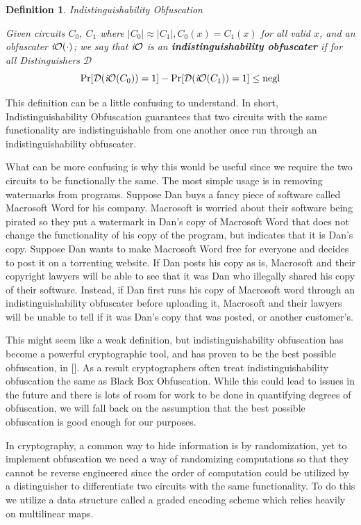 \documentclass[12pt,twoside]{reedthesis}
\newtheorem{definition}{Definition}
\begin{document}
    \begin{definition}{Indistinguishability Obfuscation}
    \par Given circuits $C_0,\ C_1$ where $|C_0| \approx |C_1|, C_0(x) = C_1(x)$ for all valid $x$, and an obfuscater $\textit{i}\mathcal{O}(\cdot)$; we say that $\textit{i}\mathcal{O}$ is an \textbf{indistinguishability obfuscater} if for all Distinguishers $\mathcal{D}$
    $$\Pr[\mathcal{D}(\textit{i}\mathcal{O}(C_0)) = 1] -\Pr[\mathcal{D}(\textit{i}\mathcal{O}(C_1)) = 1] \leq \text{negl}$$
    \end{definition}
    
    \par This definition can be a little confusing to understand. In short, Indistinguishability Obfuscation guarantees that two circuits with the same functionality are indistinguishable from one another once run through an indistinguishability obfuscater. 
    \par What can be more confusing is why this would be useful since we require the two circuits to be functionally the same. The most simple usage is in removing watermarks from programs. Suppose Dan buys a fancy piece of software called Macrosoft Word for his company. Macrosoft is worried about their software being pirated so they put a watermark in Dan's copy of Macrosoft Word that does not change the functionality of his copy of the program, but indicates that it is Dan's copy. Suppose Dan wants to make Macrosoft Word free for everyone and decides to post it on a torrenting website. If Dan posts his copy as is, Macrosoft and their copyright lawyers will be able to see that it was Dan who illegally shared his copy of their software. Instead, if Dan first runs his copy of Macrosoft word through an indistinguishability obfuscater before uploading it, Macrosoft and their lawyers will be unable to tell if it was Dan's copy that was posted, or another customer's.
    \par This might seem like a weak definition, but indistinguishability obfuscation has become a powerful cryptographic tool, and has proven to be the best possible obfuscation, in [\cite{Goldwasser:2007:BO:1760749.1760765}]. As a result cryptographers often treat indistinguishability obfuscation the same as Black Box Obfuscation. While this could lead to issues in the future and there is lots of room for work to be done in quantifying degrees of obfuscation, we will fall back on the assumption that the best possible obfuscation is good enough for our purposes.
    \par In cryptography, a common way to hide information is by randomization, yet to implement obfuscation we need a way of randomizing computations so that they cannot be reverse engineered since the order of computation could be utilized by a distinguisher to differentiate two circuits with the same functionality. To do this we utilize a data  structure called a graded encoding scheme which relies heavily on multilinear maps. 
    
\end{document}
